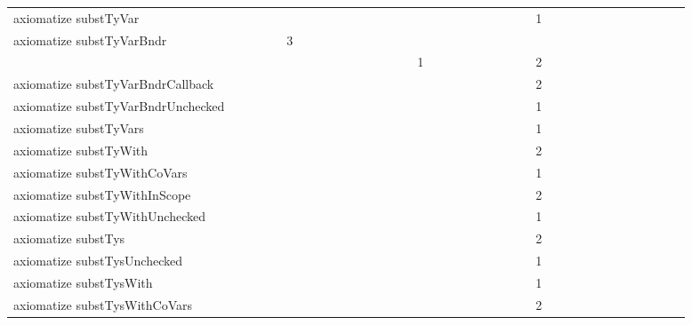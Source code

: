 {\begin{tabular}{l|rrr|rrr|rrr}
axiomatize substTyVar &  &  &  &  &  &  &  &  &  &  &  &  &  &  &  &  &  &  &  &  &  &  &  & 1 &  &  &  &  &  &  &  &  &  &  &  & \\
axiomatize substTyVarBndr &  &  &  &  & 3 &  &  &  & \\
\quad  &  &  &  &  &  &  &  &  &  &  &  &  &  &  & 1 &  &  &  &  &  &  &  &  & 2 &  &  &  &  &  &  &  &  &  &  &  & \\
axiomatize substTyVarBndrCallback &  &  &  &  &  &  &  &  &  &  &  &  &  &  &  &  &  &  &  &  &  &  &  & 2 &  &  &  &  &  &  &  &  &  &  &  & \\
axiomatize substTyVarBndrUnchecked &  &  &  &  &  &  &  &  &  &  &  &  &  &  &  &  &  &  &  &  &  &  &  & 1 &  &  &  &  &  &  &  &  &  &  &  & \\
axiomatize substTyVars &  &  &  &  &  &  &  &  &  &  &  &  &  &  &  &  &  &  &  &  &  &  &  & 1 &  &  &  &  &  &  &  &  &  &  &  & \\
axiomatize substTyWith &  &  &  &  &  &  &  &  &  &  &  &  &  &  &  &  &  &  &  &  &  &  &  & 2 &  &  &  &  &  &  &  &  &  &  &  & \\
axiomatize substTyWithCoVars &  &  &  &  &  &  &  &  &  &  &  &  &  &  &  &  &  &  &  &  &  &  &  & 1 &  &  &  &  &  &  &  &  &  &  &  & \\
axiomatize substTyWithInScope &  &  &  &  &  &  &  &  &  &  &  &  &  &  &  &  &  &  &  &  &  &  &  & 2 &  &  &  &  &  &  &  &  &  &  &  & \\
axiomatize substTyWithUnchecked &  &  &  &  &  &  &  &  &  &  &  &  &  &  &  &  &  &  &  &  &  &  &  & 1 &  &  &  &  &  &  &  &  &  &  &  & \\
axiomatize substTys &  &  &  &  &  &  &  &  &  &  &  &  &  &  &  &  &  &  &  &  &  &  &  & 2 &  &  &  &  &  &  &  &  &  &  &  & \\
axiomatize substTysUnchecked &  &  &  &  &  &  &  &  &  &  &  &  &  &  &  &  &  &  &  &  &  &  &  & 1 &  &  &  &  &  &  &  &  &  &  &  & \\
axiomatize substTysWith &  &  &  &  &  &  &  &  &  &  &  &  &  &  &  &  &  &  &  &  &  &  &  & 1 &  &  &  &  &  &  &  &  &  &  &  & \\
axiomatize substTysWithCoVars &  &  &  &  &  &  &  &  &  &  &  &  &  &  &  &  &  &  &  &  &  &  &  & 2 &  &  &  &  &  &  &  &  &  &  &  & \\

\end{tabular}}
